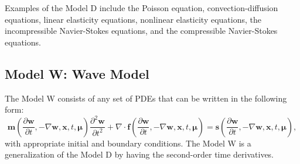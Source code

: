 \documentclass[11pt]{article}
\begin{document}

Examples of the Model D include the Poisson equation, convection-diffusion equations, linear elasticity equations, nonlinear elasticity equations, the incompressible Navier-Stokes equations, and the compressible Navier-Stokes equations. 

\subsection{Model W: Wave Model}

The Model W consists of any set of PDEs that can be written in the following form:
\begin{equation}
\label{modelw0}
\bm m \left(\frac{\partial \bm{w}}{\partial t}, - \nabla \bm w, \bm x,t, \bm \mu\right) \frac{\partial^2 \bm{w}}{\partial t^2}  + \nabla \cdot \bm{f} \left(\frac{\partial \bm{w}}{\partial t}, - \nabla \bm w, \bm x,t, \bm \mu\right) = \bm s \left(\frac{\partial \bm{w}}{\partial t}, - \nabla \bm w, \bm x,t, \bm \mu\right), 
\end{equation}
with appropriate initial and boundary conditions. The Model W is a generalization of the Model D by having the second-order time derivatives.
\end{document}
